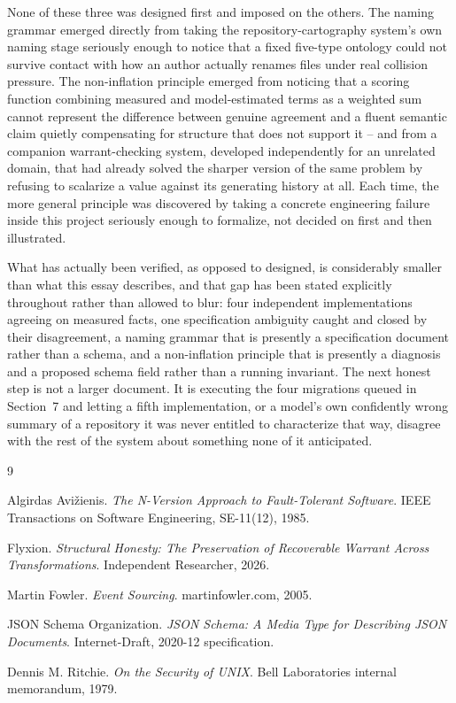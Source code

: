 \documentclass[11pt]{article}
\begin{document}
None of these three was designed first and imposed on the others. The naming grammar emerged directly from taking the repository-cartography system's own naming stage seriously enough to notice that a fixed five-type ontology could not survive contact with how an author actually renames files under real collision pressure. The non-inflation principle emerged from noticing that a scoring function combining measured and model-estimated terms as a weighted sum cannot represent the difference between genuine agreement and a fluent semantic claim quietly compensating for structure that does not support it -- and from a companion warrant-checking system, developed independently for an unrelated domain, that had already solved the sharper version of the same problem by refusing to scalarize a value against its generating history at all. Each time, the more general principle was discovered by taking a concrete engineering failure inside this project seriously enough to formalize, not decided on first and then illustrated.

What has actually been verified, as opposed to designed, is considerably smaller than what this essay describes, and that gap has been stated explicitly throughout rather than allowed to blur: four independent implementations agreeing on measured facts, one specification ambiguity caught and closed by their disagreement, a naming grammar that is presently a specification document rather than a schema, and a non-inflation principle that is presently a diagnosis and a proposed schema field rather than a running invariant. The next honest step is not a larger document. It is executing the four migrations queued in Section~7 and letting a fifth implementation, or a model's own confidently wrong summary of a repository it was never entitled to characterize that way, disagree with the rest of the system about something none of it anticipated.

\begin{thebibliography}{9}

Algirdas Avi\v{z}ienis.
\textit{The N-Version Approach to Fault-Tolerant Software}.
IEEE Transactions on Software Engineering, SE-11(12), 1985.

Flyxion.
\textit{Structural Honesty: The Preservation of Recoverable Warrant Across Transformations}.
Independent Researcher, 2026.

Martin Fowler.
\textit{Event Sourcing}.
martinfowler.com, 2005.

JSON Schema Organization.
\textit{JSON Schema: A Media Type for Describing JSON Documents}.
Internet-Draft, 2020-12 specification.

Dennis M. Ritchie.
\textit{On the Security of UNIX}.
Bell Laboratories internal memorandum, 1979.

\end{thebibliography}
\end{document}

